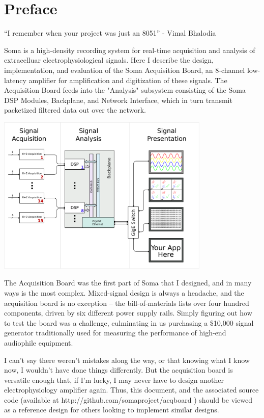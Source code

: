 \chapter*{Preface}

\begin{flushright}
``I remember when your project was just an 8051'' - Vimal Bhalodia
\end{flushright}

\vspace{0.8in}

Soma is a high-density recording system for real-time acquisition and
analysis of extracelluar electrophysiological signals. Here I describe
the design, implementation, and evaluation of the Soma Acquisition Board, 
an 8-channel low-latency amplifier for amplification and digitization
of these signals. The Acquisition Board feeds into the "Analysis" subsystem
consisting of the Soma DSP Modules, Backplane, and Network Interface,
which in turn transmit packetized filtered data out over the network. 

\begin{center}
\includegraphics[width=4in]{arch.pdf}
\end{center}

The Acquisition Board was the first part of Soma that I designed, and
in many ways is the most complex. Mixed-signal design is always a
headache, and the acquisition board is no exception -- the
bill-of-materials lists over four hundred components, driven by six
different power supply rails.  Simply figuring out how to test the
board was a challenge, culminating in us purchasing a \$10,000 signal
generator traditionally used for measuring the performance of high-end
audiophile equipment.

I can't say there weren't mistakes along the way, or that knowing what
I know now, I wouldn't have done things differently. But the
acquisition board is versatile enough that, if I'm lucky, I may never
have to design another electrophysiology amplifier again. Thus, this
document, and the associated source code (available at
http://github.com/somaproject/acqboard ) should be viewed as a
reference design for others looking to implement similar designs.



